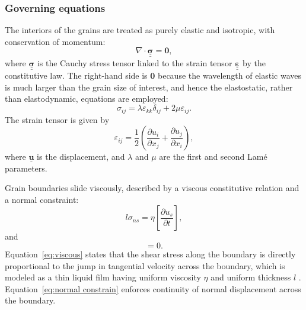 \documentclass[12pt]{article}
\newcommand{\Grad}{\nabla}
\newcommand{\Div}{\Grad\cdot}
\newcommand{\pd}[2]{\frac{\partial{#1}}{\partial{#2}}}
\newcommand{\tensor}[1]{\underline{\underline{\boldsymbol{#1}}}}
\newcommand{\vect}[1]{\underline{\boldsymbol{#1}}}
\begin{document}
\subsubsection{Governing equations}
The interiors of the grains are treated as purely elastic and isotropic, with conservation of momentum:
\begin{equation}
    \Div \tensor{\sigma} = \boldsymbol{0}, \label{eq:conservation of momentum}
\end{equation}
where $\tensor{\sigma}$ is the Cauchy stress tensor linked to the strain tensor $\tensor{\varepsilon}$ by the constitutive law.  
The right-hand side is $\boldsymbol{0}$ because the wavelength of elastic waves is much larger than the grain size of interest, and hence the elastostatic, rather than elastodynamic, equations are employed:
\begin{equation}
    \sigma_{ij} = \lambda \varepsilon_{kk} \delta_{ij} + 2\mu \varepsilon_{ij}. \label{eq:elastic constitutive law}
\end{equation}
The strain tensor is given by
\begin{equation}
    \varepsilon_{ij} = \frac{1}{2}\left(\pd{u_i}{x_j} + \pd{u_j}{x_i}\right), \label{eq:strain tensor}
\end{equation}
where $\vect{u}$ is the displacement, and $\lambda$ and $\mu$ are the first and second Lamé parameters.

Grain boundaries slide viscously, described by a viscous constitutive relation and a normal constraint:
\begin{equation}
    l \sigma_{ns} = \eta \left[\pd{u_s}{t}\right], \label{eq:viscous}
\end{equation}
and
\begin{equation}
    [u_n] = 0. \label{eq:normal constrain}
\end{equation}
Equation~\ref{eq:viscous} states that the shear stress along the boundary is directly proportional to the jump in tangential velocity across the boundary, which is modeled as a thin liquid film having uniform viscosity $\eta$ and uniform thickness $l$ \citep{raj_grain_1971}. Equation~\ref{eq:normal constrain} enforces continuity of normal displacement across the boundary.
\end{document}
